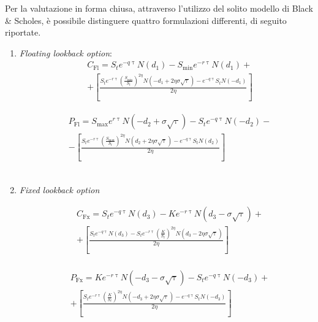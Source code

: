 \documentclass[12pt,a4paper]{report}
\begin{document}
Per la valutazione in forma chiusa, attraverso l'utilizzo del solito modello di Black \& Scholes, è possibile distinguere quattro formulazioni differenti, di seguito riportate.

\begin{enumerate}

    \item \textit{Floating lookback option}:
    \begin{equation}
    \begin{aligned}
        &C_{\text{Fl}} = S_t e^{-q \uptau} N(d_1) - S_{\text{min}} e^{-r\uptau} N(d_1) +\\
        &+\left[\frac{S_t e^{-r\uptau} \left(\frac{S_{\text{min}}}{S_t}\right)^{2\eta} N(-d_1 + 2\eta\sigma\sqrt{\uptau}) - e^{-q\uptau} S_t N(-d_1)}{2\eta}\right]
    \end{aligned}
    \end{equation}

\begin{equation}
    \begin{aligned}
        &P_{\text{Fl}} = S_{\max}e^{r\uptau}N(-d_2 + \sigma\sqrt{\uptau}) - S_t e^{-q\uptau} N(-d_2) -\\
        &- \left[\frac{S_t e^{-r\uptau} \left(\frac{S_{\text{max}}}{S_t}\right)^{2\eta} N(d_2 + 2\eta\sigma\sqrt{\uptau}) - e^{-q\uptau} S_t N(d_2)}{2\eta}\right]
    \end{aligned}
\end{equation}
\\
    \item \textit{Fixed lookback option}

\begin{equation}
    \begin{aligned}
        &C_{\text{Fx}} = S_t e^{-q\uptau}N(d_3) - K e^{-r\uptau} N(d_3 - \sigma\sqrt{\uptau}) +\\
        &+ \left[\frac{S_t e^{-q\uptau}N(d_3) - S_t e^{-r\uptau} \left(\frac{K}{S_t}\right)^{2\eta}N(d_3 - 2\eta\sigma\sqrt{\uptau})}{2\eta}\right]
    \end{aligned}
\end{equation}
\\
\begin{equation}
    \begin{aligned}
        &P_{\text{Fx}} = K e^{-r\uptau} N(-d_3 - \sigma\sqrt{\uptau}) - S_t e^{-q\uptau}N(-d_3) +\\
        &+ \left[\frac{S_t e^{-r\uptau}\left(\frac{K}{S_t}\right)^{2\eta}N(-d_3 + 2\eta\sigma\sqrt{\uptau}) - e^{-q\uptau}S_tN(-d_3)}{2\eta}\right]
    \end{aligned}
\end{equation}
    
\end{enumerate}
\end{document}
